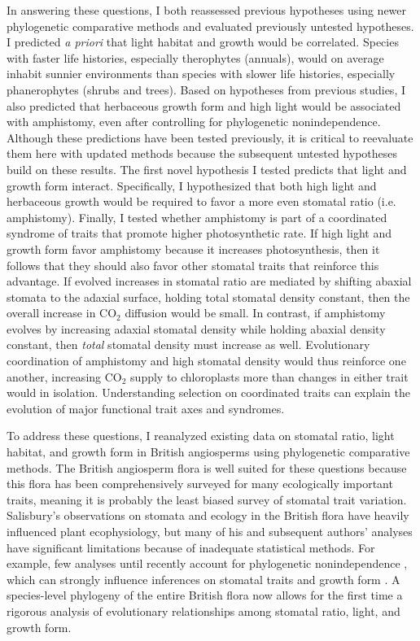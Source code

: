 \documentclass[12pt, oneside]{article}
\begin{document}
In answering these questions, I both reassessed previous hypotheses using newer phylogenetic comparative methods and evaluated previously untested hypotheses. I predicted \textit{a priori} that light habitat and growth would be correlated. Species with faster life histories, especially therophytes (annuals), would on average inhabit sunnier environments than species with slower life histories, especially phanerophytes (shrubs and trees). Based on hypotheses from previous studies, I also predicted that herbaceous growth form and high light would be associated with amphistomy, even after controlling for phylogenetic nonindependence. Although these predictions have been tested previously, it is critical to reevaluate them here with updated methods because the subsequent untested hypotheses build on these results. The first novel hypothesis I tested predicts that light and growth form interact. Specifically, I hypothesized that both high light and herbaceous growth would be required to favor a more even stomatal ratio (i.e. amphistomy). Finally, I tested whether amphistomy is part of a coordinated syndrome of traits that promote higher photosynthetic rate. If high light and growth form favor amphistomy because it increases photosynthesis, then it follows that they should also favor other stomatal traits that reinforce this advantage. If evolved increases in stomatal ratio are mediated by shifting abaxial stomata to the adaxial surface, holding total stomatal density constant, then the overall increase in CO$_2$ diffusion would be small. In contrast, if amphistomy evolves by increasing adaxial stomatal density while holding abaxial density constant, then \textit{total} stomatal density must increase as well. Evolutionary coordination of amphistomy and high stomatal density would thus reinforce one another, increasing CO$_2$ supply to chloroplasts more than changes in either trait would in isolation. Understanding selection on coordinated traits can explain the evolution of major functional trait axes and syndromes.

To address these questions, I reanalyzed existing data on stomatal ratio, light habitat, and growth form in British angiosperms \citep{Salisbury_1927, Fitter_Peat_1994a, BEF} using phylogenetic comparative methods. The British angiosperm flora is well suited for these questions because this flora has been comprehensively surveyed for many ecologically important traits, meaning it is probably the least biased survey of stomatal trait variation. Salisbury's observations on stomata and ecology in the British flora have heavily influenced plant ecophysiology, but many of his and subsequent authors' analyses have significant limitations because of inadequate statistical methods. For example, few analyses until recently account for phylogenetic nonindependence \citep{Felsenstein_1985}, which can strongly influence inferences on stomatal traits and growth form \citep[this study did not consider light]{Kelly_Beerling_1995}. A species-level phylogeny of the entire British flora \citep{Lim_etal_2014} now allows for the first time a rigorous analysis of evolutionary relationships among stomatal ratio, light, and growth form. 
\end{document}
